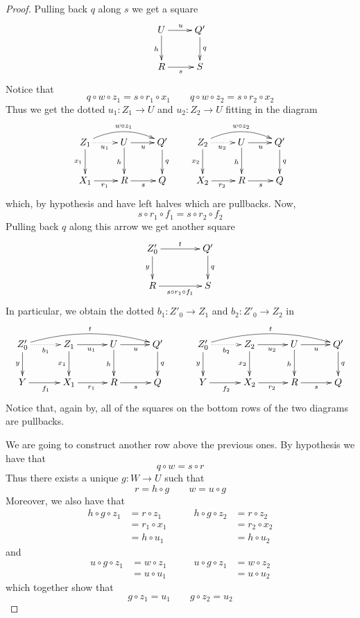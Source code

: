 \documentclass[a4paper]{article}
\theoremstyle{definition}
\begin{document}
\begin{proof}Pulling back  $q$ along $s$ we get a square 
	\[\xymatrix{U \ar[r]^{u} \ar[d]_{h}& Q' \ar[d]^{q}\\ R \ar[r]_s & S}\]
	Notice that
	\[
	q\circ w\circ z_1=s\circ r_1\circ x_1 \qquad 
	q\circ w\circ z_2=s\circ r_2\circ x_2 \]
	Thus we get the dotted $u_1\colon Z_1\to U$ and $u_2\colon Z_2\to U$ fitting in the diagram
	\[\xymatrix{  Z_1  \ar@/^.4cm/[rr]^{w\circ z_1}\ar@{.>}[r]_{u_1}\ar[d]_{x_1}&  U \ar[d]_h \ar[r]_{u} & Q'  \ar[d]^{q}&  Z_2 \ar@/^.4cm/[rr]^{w\circ z_2} \ar@{.>}[r]_{u_2}\ar[d]_{x_2} &  U \ar[d]_h \ar[r]_{u}& Q' \ar[d]^{q} \\  X_1 \ar[r]_{r_1} & R \ar[r]_s& Q & X_2 \ar[r]_{r_2}& R \ar[r]_s & Q}\]
	which, by hypothesis and   have left halves which are pullbacks. Now,
	\[s\circ r_1\circ f_1 =s\circ r_2\circ f_2\]
	Pulling back $q$ along this arrow we get another square
	\[\xymatrix@C=40pt{Z'_0 \ar[r]^{t} \ar[d]_{y}& Q' \ar[d]^{q}\\ R \ar[r]_{s\circ r_1\circ f_1} & S}\]
	In particular, we obtain the dotted $b_1\colon Z'_0\to Z_1$ and $b_2\colon Z'_0\to Z_2$ in
	\[\xymatrix@C=30pt{ Z'_0 \ar@/^.4cm/[rrr]^{t}\ar[d]_{y} \ar@{.>}[r]_{b_1} & Z_1  \ar[r]_{u_1}\ar[d]_{x_1}&  U \ar[d]_h \ar[r]_{u} & Q'  \ar[d]^{q} &Z'_0 \ar@/^.4cm/[rrr]^{t} \ar[d]_{y}\ar@{.>}[r]_{b_2}  & Z_2  \ar[r]_{u_2}\ar[d]_{x_2} &  U \ar[d]_h \ar[r]_{u}& Q' \ar[d]^{q} \\ Y \ar[r]_{f_1}& X_1 \ar[r]_{r_1} & R \ar[r]_s& Q & Y \ar[r]_{f_2} & X_2 \ar[r]_{r_2}& R \ar[r]_s & Q}\]
	Notice that, again  by, all of the squares on the bottom rows of the two diagrams are pullbacks. 
	
	We are going to construct another row above the previous ones. By hypothesis we have that
	\[q\circ w = s\circ r\]
	Thus there exists a unique $g\colon W\to U$ such that
	\[r=h\circ g \qquad w=u\circ g\]
	Moreover, we also have that
	\[\begin{split}h\circ g \circ z_1&=r \circ z_1\\&= r_1\circ x_1 \\&=h\circ u_1
	\end{split}\qquad\begin{split}h\circ g \circ z_2&=r \circ z_2\\&= r_2\circ x_2 \\&=h\circ u_2
	\end{split}\]
	and 
	\[\begin{split}u\circ g \circ z_1&=w \circ z_1\\&= u\circ u_1 
	\end{split} \qquad \begin{split}u\circ g \circ z_1&=w \circ z_2\\&= u\circ u_2
	\end{split}\]
	which together show that
	\[g\circ z_1=u_1 \qquad g\circ z_2=u_2\]
	

\end{proof}
\end{document}
